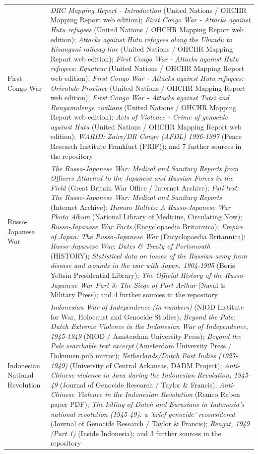 \documentclass[11pt]{article}
\begin{document}
\begin{scriptsize}
\begin{longtable}{p{3.5cm} p{12.5cm}}
\addlinespace
First Congo War & \emph{DRC Mapping Report - Introduction} (United Nations / OHCHR Mapping Report web edition); \emph{First Congo War - Attacks against Hutu refugees} (United Nations / OHCHR Mapping Report web edition); \emph{Attacks against Hutu refugees along the Ubundu to Kisangani railway line} (United Nations / OHCHR Mapping Report web edition); \emph{First Congo War - Attacks against Hutu refugees: Equateur} (United Nations / OHCHR Mapping Report web edition); \emph{First Congo War - Attacks against Hutu refugees: Orientale Province} (United Nations / OHCHR Mapping Report web edition); \emph{First Congo War - Attacks against Tutsi and Banyamulenge civilians} (United Nations / OHCHR Mapping Report web edition); \emph{Acts of Violence - Crime of genocide against Hutu} (United Nations / OHCHR Mapping Report web edition); \emph{WARID: Zaire/DR Congo (AFDL) 1996-1997} (Peace Research Institute Frankfurt (PRIF)); and 7 further sources in the repository \\
\addlinespace
Russo-Japanese War & \emph{The Russo-Japanese War: Medical and Sanitary Reports from Officers Attached to the Japanese and Russian Forces in the Field} (Great Britain War Office / Internet Archive); \emph{Full text: The Russo-Japanese War: Medical and Sanitary Reports} (Internet Archive); \emph{Human Bullets: A Russo-Japanese War Photo Album} (National Library of Medicine, Circulating Now); \emph{Russo-Japanese War Facts} (Encyclopaedia Britannica); \emph{Empire of Japan: The Russo-Japanese War} (Encyclopaedia Britannica); \emph{Russo-Japanese War: Dates \& Treaty of Portsmouth} (HISTORY); \emph{Statistical data on losses of the Russian army from disease and wounds in the war with Japan, 1904-1905} (Boris Yeltsin Presidential Library); \emph{The Official History of the Russo-Japanese War Part 3: The Siege of Port Arthur} (Naval \& Military Press); and 4 further sources in the repository \\
\addlinespace
Indonesian National Revolution & \emph{Indonesian War of Independence (in numbers)} (NIOD Institute for War, Holocaust and Genocide Studies); \emph{Beyond the Pale: Dutch Extreme Violence in the Indonesian War of Independence, 1945-1949} (NIOD / Amsterdam University Press); \emph{Beyond the Pale searchable text excerpt} (Amsterdam University Press / Dokumen.pub mirror); \emph{Netherlands/Dutch East Indies (1927-1949)} (University of Central Arkansas, DADM Project); \emph{Anti-Chinese violence in Java during the Indonesian Revolution, 1945-49} (Journal of Genocide Research / Taylor \& Francis); \emph{Anti-Chinese Violence in the Indonesian Revolution} (Remco Raben paper PDF); \emph{The killing of Dutch and Eurasians in Indonesia's national revolution (1945-49): a 'brief genocide' reconsidered} (Journal of Genocide Research / Taylor \& Francis); \emph{Rengat, 1949 (Part 1)} (Inside Indonesia); and 3 further sources in the repository \\

\end{longtable}
\end{scriptsize}
\end{document}
